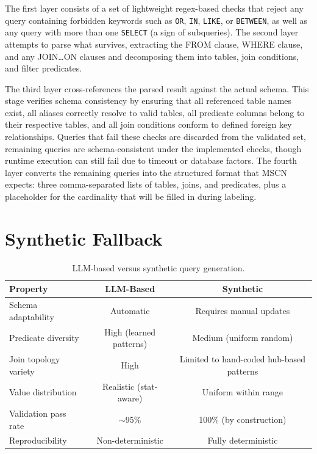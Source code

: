 The first layer consists of a set of lightweight regex-based checks that reject any query containing forbidden keywords such as \texttt{OR}, \texttt{IN}, \texttt{LIKE}, or \texttt{BETWEEN}, as well as any query with more than one \texttt{SELECT} (a sign of subqueries). The second layer attempts to parse what survives, extracting the FROM clause, WHERE clause, and any JOIN\ldots ON clauses and decomposing them into tables, join conditions, and filter predicates.

The third layer cross-references the parsed result against the actual schema. This stage verifies schema consistency by ensuring that all referenced table names exist, all aliases correctly resolve to valid tables, all predicate columns belong to their respective tables, and all join conditions conform to defined foreign key relationships. Queries that fail these checks are discarded from the validated set, remaining queries are schema-consistent under the implemented checks, though runtime execution can still fail due to timeout or database factors. The fourth layer converts the remaining queries into the structured format that MSCN expects: three comma-separated lists of tables, joins, and predicates, plus a placeholder for the cardinality that will be filled in during labeling.


\section{Synthetic Fallback}

\begin{table}[tb]
\centering
\caption{LLM-based versus synthetic query generation.}
\label{tab:gen_comparison}
\begin{tabular}{|l|c|c|}
\hline
\textbf{Property} & \textbf{LLM-Based} & \textbf{Synthetic} \\
\hline
Schema adaptability & Automatic & Requires manual updates \\
Predicate diversity & High (learned patterns) & Medium (uniform random) \\
Join topology variety & High & Limited to hand-coded hub-based patterns \\
Value distribution & Realistic (stat-aware) & Uniform within range \\
Validation pass rate & $\sim$95\% & 100\% (by construction) \\
Reproducibility & Non-deterministic & Fully deterministic \\
\hline
\end{tabular}
\end{table}

